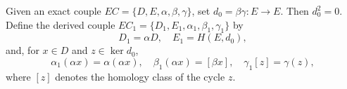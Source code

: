 Given an exact couple $\mathit{EC} = \{D, E, \alpha, \beta, \gamma\}$, set $d_0 = \beta\gamma : E \to E$. Then $d_0^2 = 0$. Define the derived couple $\mathit{EC}_1 = \{D_1, E_1, \alpha_1, \beta_1, \gamma_1\}$ by
$$D_1 = \alpha D, \quad E_1 = H(E, d_0),$$
and, for $x \in D$ and $z \in \ker d_0$,
$$\alpha_1(\alpha x) = \alpha(\alpha x), \quad \beta_1(\alpha x) = [\beta x], \quad \gamma_1[z] = \gamma(z),$$
where $[z]$ denotes the homology class of the cycle $z$.
